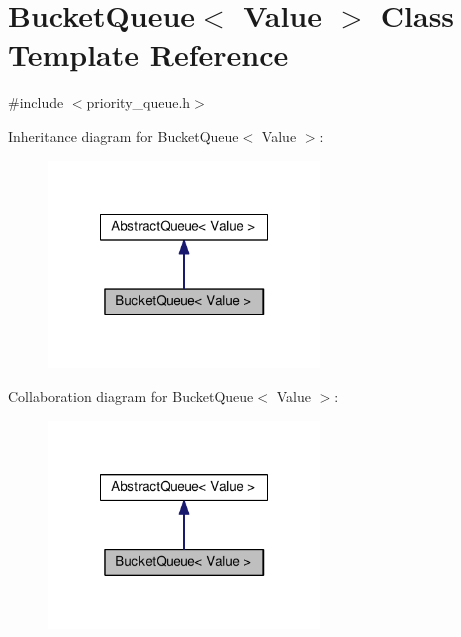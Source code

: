 \hypertarget{classBucketQueue}{\section{Bucket\-Queue$<$ Value $>$ Class Template Reference}
\label{classBucketQueue}
}


{\ttfamily \#include $<$priority\-\_\-queue.\-h$>$}



Inheritance diagram for Bucket\-Queue$<$ Value $>$\-:
\nopagebreak
\begin{figure}[H]
\begin{center}
\leavevmode
\includegraphics[width=204pt]{classBucketQueue__inherit__graph}
\end{center}
\end{figure}


Collaboration diagram for Bucket\-Queue$<$ Value $>$\-:
\nopagebreak
\begin{figure}[H]
\begin{center}
\leavevmode
\includegraphics[width=204pt]{classBucketQueue__coll__graph}
\end{center}
\end{figure}
